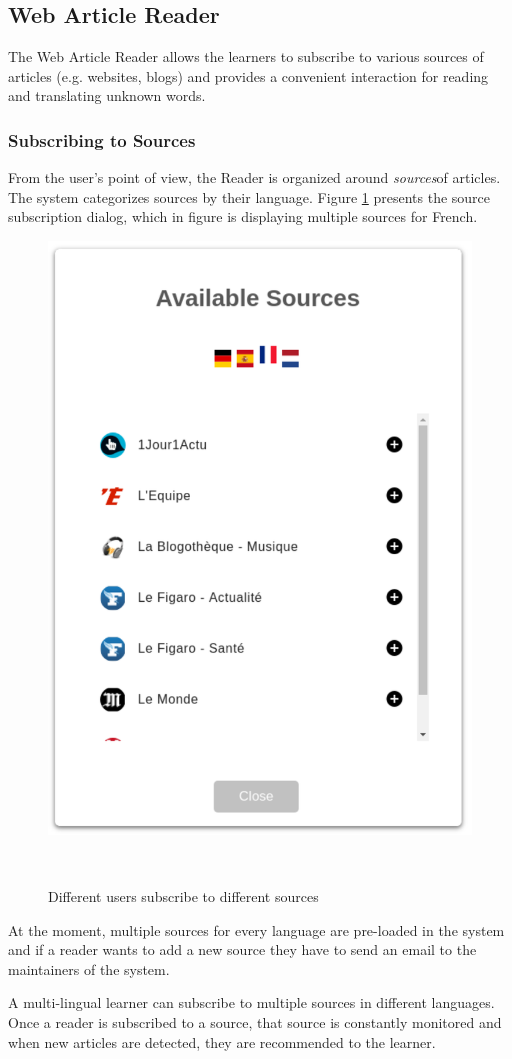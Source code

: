 
\subsection{Web Article Reader}

The Web Article Reader allows the learners to subscribe to various sources of articles (e.g. websites, blogs) and provides a convenient interaction for reading and translating unknown words. 


\subsubsection{Subscribing to Sources}
From the user's point of view, the Reader is organized around {\em sources}of articles. The system categorizes sources by their language. Figure \ref{fig:system_subscriptions} presents the source subscription dialog, which in figure is displaying multiple sources for French. 


    \begin{figure}[h!]
    \centering
      \includegraphics[width=0.4\columnwidth]{figures/available_sources}
      \caption{Different users subscribe to different sources}~\label{fig:system_subscriptions}
    \end{figure}

At the moment, multiple sources for every language are pre-loaded in the system and if a reader wants to add a new source they have to send an email to the maintainers of the system. 

A multi-lingual learner can subscribe to multiple sources in different languages. Once a reader is subscribed to a source, that source is constantly monitored and when new articles are detected, they are recommended to the learner. 

